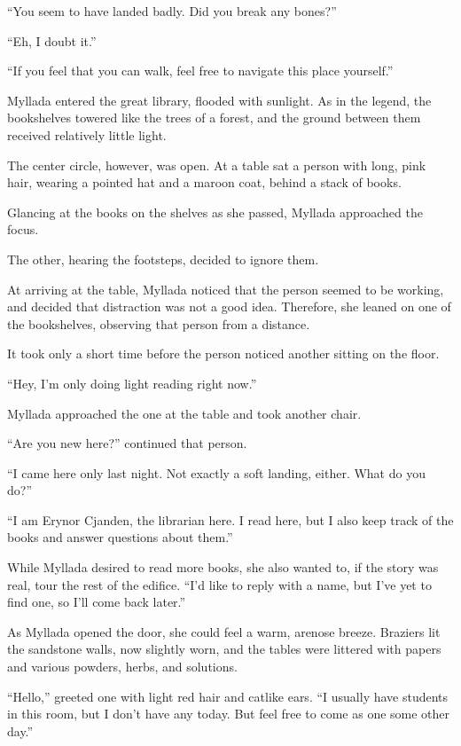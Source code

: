 ``You seem to have landed badly. Did you break any bones?''

``Eh, I doubt it.''

``If you feel that you can walk, feel free to navigate this place yourself.''

\centeredstars

Myllada entered the great library, flooded with sunlight. As in the legend, the bookshelves towered like the trees of a forest, and the ground between them received relatively little light.

The center circle, however, was open. At a table sat a person with long, pink hair, wearing a pointed hat and a maroon coat, behind a stack of books.

Glancing at the books on the shelves as she passed, Myllada approached the focus.

The other, hearing the footsteps, decided to ignore them.

At arriving at the table, Myllada noticed that the person seemed to be working, and decided that distraction was not a good idea. Therefore, she leaned on one of the bookshelves, observing that person from a distance.

It took only a short time before the person noticed another sitting on the floor.

``Hey, I'm only doing light reading right now.''

Myllada approached the one at the table and took another chair.

``Are you new here?'' continued that person.

``I came here only last night. Not exactly a soft landing, either. What do you do?''

``I am Erynor Cjanden, the librarian here. I read here, but I also keep track of the books and answer questions about them.''

While Myllada desired to read more books, she also wanted to, if the story was real, tour the rest of the edifice. ``I'd like to reply with a name, but I've yet to find one, so I'll come back later.''

\centeredstars

As Myllada opened the door, she could feel a warm, arenose breeze. Braziers lit the sandstone walls, now slightly worn, and the tables were littered with papers and various powders, herbs, and solutions.

``Hello,'' greeted one with light red hair and catlike ears. ``I usually have students in this room, but I don't have any today. But feel free to come as one some other day.''

